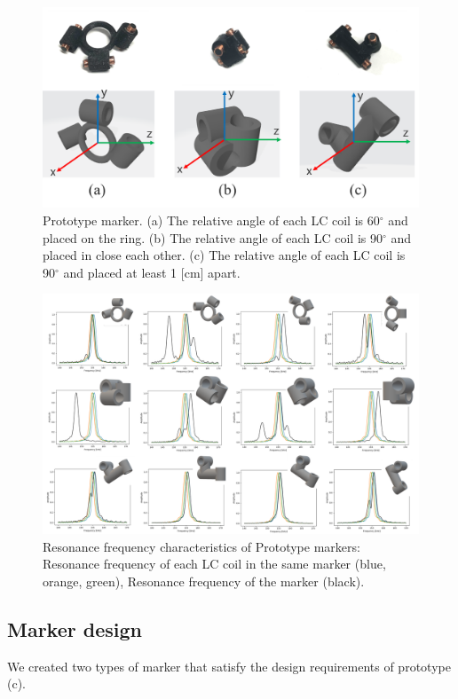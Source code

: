 \documentclass[journal,twoside,web]{ieeecolor}
\begin{document}
\begin{figure}[t]
    \centerline{\includegraphics[width=\columnwidth]{figure/marker_prototype2.png}}
    \caption{Prototype marker. (a) The relative angle of each LC coil is 60$^\circ$ and  placed on the ring. (b) The relative angle of each LC coil is 90$^\circ$ and placed in close each other. (c) The relative angle of each LC coil is 90$^\circ$ and placed at least 1 [cm] apart.}
    \label{marker_prototype}
\end{figure}

\begin{figure}[t]
\centerline{\includegraphics[width=2\columnwidth]{figure/frequency_characteristics.png}}
    \caption{Resonance frequency characteristics of Prototype markers: Resonance frequency of each LC coil in the same marker (blue, orange, green), Resonance frequency of the marker (black).}
    \label{freq_charac}
\end{figure}

\subsection{Marker design}
We created two types of marker that satisfy the design requirements of prototype (c). 
\end{document}
